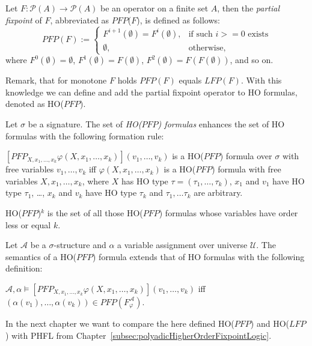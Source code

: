 \begin{definition}
    Let $F: \mathscr{P}(A) \rightarrow \mathscr{P}(A)$ be an operator on a finite set $A$, then the \emph{partial
    fixpoint} of $F$, abbreviated as $\mathit{PFP}$($F$), is defined as follows:
    \[\mathit{PFP}(F):=\begin{cases}
               F^{i+1}(\emptyset)=F^i(\emptyset),  & \text{if such } i >= 0 \text{ exists}\\
               \emptyset, & \text{otherwise,}
    \end{cases}\]
    where $F^0(\emptyset) = \emptyset$, $F^1(\emptyset) = F(\emptyset)$, $F^2(\emptyset) = F(F(\emptyset))$, and so on.
\end{definition}

Remark, that for monotone $F$ holds $\mathit{PFP}(F)$ equals $\mathit{LFP}(F)$. With this knowledge we can define and
add the partial fixpoint operator to HO formulas, denoted as HO($\mathit{PFP}$).

\begin{definition}
    Let $\sigma$ be a signature. The set of \emph{HO($\mathit{PFP}$) formulas} enhances the set of HO formulas with the
    following formation rule:
    \begin{compactitem}
        \item $[\mathit{PFP}_{X, x_1, \dots, x_k}\varphi(X, x_1, \dots, x_k)](v_1, \dots, v_k)$ is a HO($\mathit{PFP}$) formula over
        $\sigma$ with free variables $v_1, \dots, v_k$ iff $\varphi(X, x_1, \dots, x_k)$ is a HO($\mathit{PFP}$) formula with
        free variables $X, x_1, \dots, x_k$, where $X$ has HO type $\tau = (\tau_1, \dots, \tau_k)$, $x_1$ and $v_1$
        have HO type $\tau_1$, \dots, $x_k$ and $v_k$ have HO type $\tau_k$ and $\tau_1, \dots \tau_k$ are arbitrary.
    \end{compactitem}
\end{definition}

HO($\mathit{PFP}$)$^k$ is the set of all those HO($\mathit{PFP}$) formulas whose variables have order less or equal $k$.

\begin{definition}
    Let $\mathcal{A}$ be a $\sigma$-structure and $\alpha$ a variable assignment over universe $\mathcal{U}$. The
    semantics of a HO($\mathit{PFP}$) formula extends that of HO formulas with the following definition:
    \begin{compactitem}
        \item $\mathcal{A}, \alpha \models [\mathit{PFP}_{X, x_1, \dots, x_k}\varphi(X, x_1, \dots, x_k)](v_1, \dots, v_k)$
        iff $(\alpha(v_1), \dots, \alpha(v_k)) \in \mathit{PFP}(F_\varphi^\mathcal{A})$.
    \end{compactitem}
\end{definition}

In the next chapter we want to compare the here defined HO($\mathit{PFP}$) and HO($\mathit{LFP}$) with PHFL from
Chapter~\ref{subsec:polyadicHigherOrderFixpointLogic}.